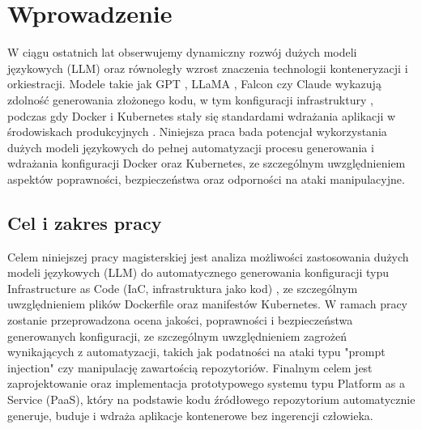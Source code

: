 \clearpage %
\section{Wprowadzenie}

W ciągu ostatnich lat obserwujemy dynamiczny rozwój dużych modeli językowych (LLM) \cite{zhao_survey_2025} oraz równoległy wzrost znaczenia technologii konteneryzacji i orkiestracji. Modele takie jak GPT \cite{brown_language_2020}, LLaMA \cite{touvron_llama_2023}, Falcon \cite{almazrouei_falcon_2023} czy Claude \cite{anthropic_claude} wykazują zdolność generowania złożonego kodu, w tym konfiguracji infrastruktury \cite{srivatsa_survey_2024}, podczas gdy Docker \cite{merkel_docker_nodate} i Kubernetes \cite{burns_borg_2016} stały się standardami wdrażania aplikacji w środowiskach produkcyjnych \cite{kratzke_dont_2024}. Niniejsza praca bada potencjał wykorzystania dużych modeli językowych do pełnej automatyzacji procesu generowania i wdrażania konfiguracji Docker oraz Kubernetes, ze szczególnym uwzględnieniem aspektów poprawności, bezpieczeństwa oraz odporności na ataki manipulacyjne.

\subsection{Cel i zakres pracy}

Celem niniejszej pracy magisterskiej jest analiza możliwości zastosowania dużych modeli językowych (LLM) do automatycznego generowania konfiguracji typu Infrastructure as Code (IaC, infrastruktura jako kod) \cite{pahl_infrastructure_nodate}, ze szczególnym uwzględnieniem plików Dockerfile oraz manifestów Kubernetes.
W ramach pracy zostanie przeprowadzona ocena jakości, poprawności i bezpieczeństwa generowanych konfiguracji, ze szczególnym uwzględnieniem zagrożeń wynikających z automatyzacji, takich jak podatności na ataki typu "prompt injection" czy manipulację zawartością repozytoriów. Finalnym celem jest zaprojektowanie oraz implementacja prototypowego systemu typu Platform as a Service (PaaS), który na podstawie kodu źródłowego repozytorium automatycznie generuje, buduje i wdraża aplikacje kontenerowe bez ingerencji człowieka.

